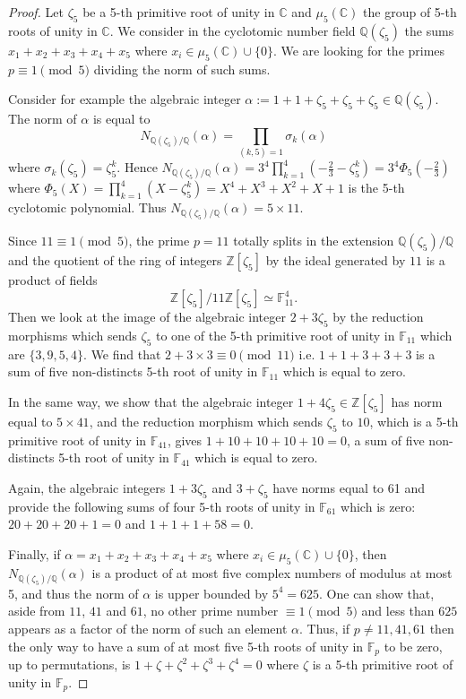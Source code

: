 \documentclass[12pt]{amsart}
\theoremstyle{definition}
\begin{document}
\begin{proof}
Let $\zeta_5$ be a 5-th primitive root of unity in $\mathbb C$ and $\mu_5({\mathbb C})$ the group of 5-th roots of unity in ${\mathbb C}$.
We consider in the cyclotomic number field ${\mathbb Q}(\zeta_5)$  the sums
$x_1+x_2+x_3+x_4+x_5$ where $x_i\in\mu_5({\mathbb C})\cup \{0\}$. We are looking for the primes $p\equiv 1\pmod 5$ dividing the norm of such sums.

Consider for example the algebraic integer $\alpha:=1+1+\zeta_5+\zeta_5+\zeta_5\in {\mathbb Q}(\zeta_5)$. The norm of $\alpha$ is equal to 
$$N_{{\mathbb Q}(\zeta_5)/{\mathbb Q}}(\alpha)=\prod_{(k,5)=1}\sigma_k(\alpha)$$
where $\sigma_k(\zeta_5)=\zeta_5^k$. Hence $N_{{\mathbb Q}(\zeta_5)/{\mathbb Q}}(\alpha)=3^4\prod_{k=1}^4\left(-\frac{2}{3}-\zeta_5^k\right)=3^4\Phi_5(-\frac{2}{3})$ where $\Phi_5(X)=\prod_{k=1}^4(X-\zeta_5^k)=X^4+X^3+X^2+X+1$ is the 5-th cyclotomic polynomial. Thus $N_{{\mathbb Q}(\zeta_5)/{\mathbb Q}}(\alpha)=5\times 11$.

Since $11\equiv 1\pmod 5$, the prime $p=11$ totally splits in the extension ${\mathbb Q}(\zeta_5)/{\mathbb Q}$ and the quotient of the ring of integers 
${\mathbb Z}[\zeta_5]$ by the ideal generated by $11$ is a product of fields
$${\mathbb Z}[\zeta_5]/11{\mathbb Z}[\zeta_5]\simeq {\mathbb F}_{11}^4.$$
Then we look at the image of the algebraic integer $2+3\zeta_5$ by the reduction morphisms which sends $\zeta_5$ to one of the 5-th primitive root of unity in ${\mathbb F}_{11}$ which are $\{3,9,5,4\}$. We find that $2+3\times 3\equiv 0\pmod{11}$ i.e. $1+1+3+3+3$ is a sum of five non-distincts 5-th root of unity in ${\mathbb F}_{11}$ which is equal to zero.

In the same way, we show that the algebraic integer $1+4\zeta_5\in{\mathbb Z}[\zeta_5]$ has norm equal to $5\times 41$, and the reduction morphism which sends $\zeta_5$ to  $10$, which is a 5-th primitive root of unity in ${\mathbb F}_{41}$, gives $1+10+10+10+10=0$,  a sum of five non-distincts 5-th root of unity in ${\mathbb F}_{41}$ which is equal to zero.

Again, the algebraic integers $1+3\zeta_5$ and $3+\zeta_5$ have norms equal to 61 and provide the following sums of four 5-th roots of unity in ${\mathbb F}_{61}$ which is zero: 
$20+20+20+1=0$ and $1+1+1+58=0$.

Finally, if $\alpha=x_1+x_2+x_3+x_4+x_5$ where $x_i\in\mu_5({\mathbb C})\cup \{0\}$, then $N_{{\mathbb Q}(\zeta_5)/{\mathbb Q}}(\alpha)$ is a product of at most five complex numbers of modulus at most 5, and thus the norm of $\alpha$ is upper bounded by $5^4=625$.
One can show that, aside from $11$, $41$ and $61$, no other prime number $\equiv 1\pmod 5$ and less than $625$ appears as a factor of the norm of such an element $\alpha$.
Thus, if $p\not= 11, 41, 61$ then the only way to have a  sum of at most five 5-th roots of unity in ${\mathbb F}_p$ to be zero, up to permutations, is 
$1+\zeta+\zeta^2+\zeta^3+\zeta^4=0$ where $\zeta$ is a 5-th primitive root of unity in  ${\mathbb F}_p$.
\end{proof}
\end{document}
